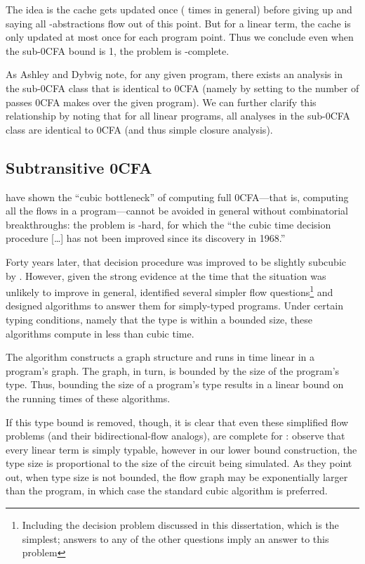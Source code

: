 The idea is the cache gets updated once ( times in general) before
giving up and saying all -abstractions flow out of this
point.  But for a linear term, the cache is only updated at most once
for each program point.  Thus we conclude even when the sub-0CFA bound
is 1, the problem is \ptime-complete.

As Ashley and Dybvig note, for any given program, there exists an
analysis in the sub-0CFA class that is identical to 0CFA (namely by
setting  to the number of passes 0CFA makes over the given
program).  We can further clarify this relationship by noting that for
all linear programs, all analyses in the sub-0CFA class are identical
to 0CFA (and thus simple closure analysis).

\subsection{Subtransitive 0CFA}

\citet{heintze-mcallester-lics97} have shown the ``cubic bottleneck''
of computing full 0CFA---that is, computing all the flows in a
program---cannot be avoided in general without combinatorial
breakthroughs: the problem is {}-hard, for which the ``the
cubic time decision procedure [\dots] has not been improved since its
discovery in 1968.''

Forty years later, that decision procedure was improved to be slightly
subcubic by \citet{chaudhuri-popl08}.  However, given the strong
evidence at the time that the situation was unlikely to improve in
general, \citet{heintze-mcallester-pldi97} identified several simpler
flow questions\footnote{Including the decision problem discussed in
  this dissertation, which is the simplest; answers to any of the
  other questions imply an answer to this problem} and designed
algorithms to answer them for simply-typed programs. Under certain
typing conditions, namely that the type is within a bounded size,
these algorithms compute in less than cubic time.

The algorithm constructs a graph structure and runs in time linear in a
program's graph.  The graph, in turn, is bounded by the size of the
program's type.  Thus, bounding the size of a program's type results
in a linear bound on the running times of these algorithms.  

If this type bound is removed, though, it is clear that even these
simplified flow problems (and their bidirectional-flow analogs), are
complete for \ptime: observe that every linear term is simply typable,
however in our lower bound construction, the type size is proportional
to the size of the circuit being simulated.  As they point out, when
type size is not bounded, the flow graph may be exponentially larger
than the program, in which case the standard cubic algorithm is
preferred.

